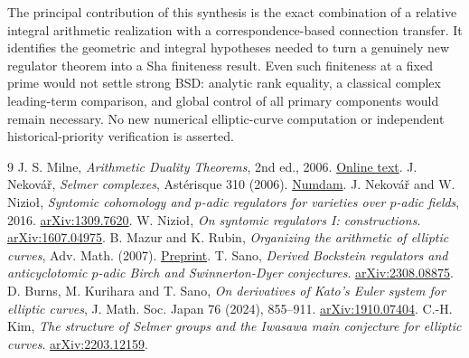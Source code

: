 \documentclass[11pt,a4paper]{article}
\begin{document}
The principal contribution of this synthesis is the exact combination of a relative integral arithmetic realization with a correspondence-based connection transfer. It identifies the geometric and integral hypotheses needed to turn a genuinely new regulator theorem into a Sha finiteness result. Even such finiteness at a fixed prime would not settle strong BSD: analytic rank equality, a classical complex leading-term comparison, and global control of all primary components would remain necessary. No new numerical elliptic-curve computation or independent historical-priority verification is asserted.

\begin{thebibliography}{9}\small\setlength{\itemsep}{1pt}
 J. S. Milne, \emph{Arithmetic Duality Theorems}, 2nd ed., 2006. \href{https://jmilne.org/math/Books/ADTnot.pdf}{Online text}.
 J. Nekov\'a\v r, \emph{Selmer complexes}, Ast\'erisque 310 (2006). \href{https://www.numdam.org/item/AST_2006__310__R1_0/}{Numdam}.
 J. Nekov\'a\v r and W. Nizio\l, \emph{Syntomic cohomology and $p$-adic regulators for varieties over $p$-adic fields}, 2016. \href{https://arxiv.org/abs/1309.7620}{arXiv:1309.7620}.
 W. Nizio\l, \emph{On syntomic regulators I: constructions}. \href{https://arxiv.org/abs/1607.04975}{arXiv:1607.04975}.
 B. Mazur and K. Rubin, \emph{Organizing the arithmetic of elliptic curves}, Adv. Math. (2007). \href{https://www.math.uci.edu/~krubin/preprints/organization.pdf}{Preprint}.
 T. Sano, \emph{Derived Bockstein regulators and anticyclotomic $p$-adic Birch and Swinnerton-Dyer conjectures}. \href{https://arxiv.org/abs/2308.08875}{arXiv:2308.08875}.
 D. Burns, M. Kurihara and T. Sano, \emph{On derivatives of Kato's Euler system for elliptic curves}, J. Math. Soc. Japan 76 (2024), 855--911. \href{https://arxiv.org/abs/1910.07404}{arXiv:1910.07404}.
 C.-H. Kim, \emph{The structure of Selmer groups and the Iwasawa main conjecture for elliptic curves}. \href{https://arxiv.org/abs/2203.12159}{arXiv:2203.12159}.
\end{thebibliography}
\end{document}
